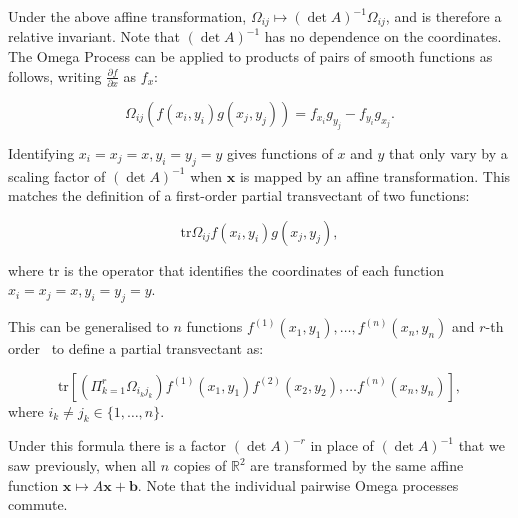 \documentclass{artjlt}
\begin{document}
Under the above affine transformation, $\Omega_{ij} \mapsto (\det A)^{-1}
\Omega_{ij}$, and is therefore a relative invariant. Note that $(\det A)^{-1}$ has no dependence on the coordinates.
The Omega Process can be applied to products of pairs of smooth functions as follows,
writing $\frac{\partial f}{\partial x}$ as $f_x$:

\begin{equation}
\Omega_{ij} \left(f(x_i, y_i) g(x_j, y_j)\right) = f_{x_i}g_{y_j} - f_{y_i}g_{x_j}.
\end{equation}

Identifying $x_i = x_j = x, y_i = y_j = y$ gives functions of $x$ and $y$
that only vary by a scaling factor of $(\det A)^{-1}$ when $\mathbf{x}$ is
mapped by an affine transformation. This matches the definition of a
first-order partial transvectant of two functions:

\begin{equation}
\mbox{tr} \Omega_{ij} f(x_i, y_i) g(x_j, y_j),
\end{equation}

\noindent where $\mbox{tr}$  is the operator that identifies the coordinates of each function $x_i = x_j = x, y_i = y_j = y$.

This can be generalised to $n$ functions $f^{(1)}(x_1, y_1), \ldots, f^{(n)}(x_n, y_n)$ and $r$-th order~\citep{OlverEIS} to define a partial transvectant as:

\begin{equation}
\mbox{tr} \left[\left( \Pi_{k=1}^r \Omega_{i_k j_k} \right) f^{(1)}(x_1, y_1)
f^{(2)}(x_2, y_2), \ldots f^{(n)} (x_n, y_n)\right],
\end{equation}
where $i_k \neq j_k \in \{1, \ldots, n\}$.

Under this formula there is a factor $(\det A)^{-r}$ in place of $(\det
A)^{-1}$ that we saw previously, when all $n$ copies of $\mathbb{R}^2$ are
transformed by the same affine function $\mathbf{x} \mapsto A\mathbf{x} +
\mathbf{b}$. Note that the individual pairwise Omega processes commute.
\end{document}
